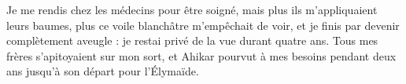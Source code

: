 Je me rendis chez les médecins pour être soigné, mais plus ils m’appliquaient leurs baumes, plus ce voile blanchâtre m’empêchait de voir, et je finis par devenir complètement aveugle : je restai privé de la vue durant quatre ans. Tous mes frères s’apitoyaient sur mon sort, et Ahikar pourvut à mes besoins pendant deux ans jusqu’à son départ pour l’Élymaïde.